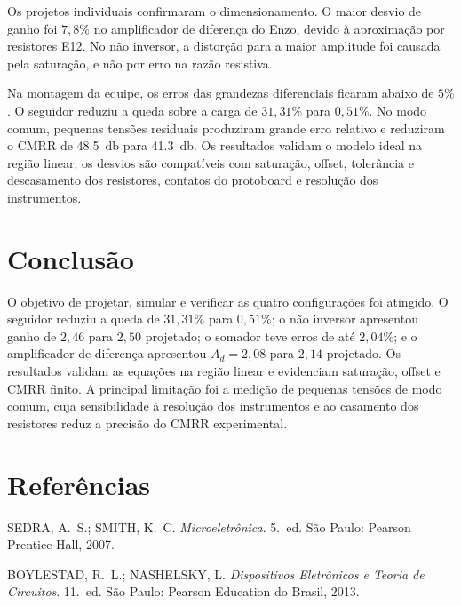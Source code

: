 \documentclass[11pt,a4paper]{article}
\begin{document}
Os projetos individuais confirmaram o dimensionamento. O maior desvio de ganho foi $7,8\%$ no amplificador de diferença do Enzo, devido à aproximação por resistores E12. No não inversor, a distorção para a maior amplitude foi causada pela saturação, e não por erro na razão resistiva.

Na montagem da equipe, os erros das grandezas diferenciais ficaram abaixo de $5\%$. O seguidor reduziu a queda sobre a carga de $31,31\%$ para $0,51\%$. No modo comum, pequenas tensões residuais produziram grande erro relativo e reduziram o CMRR de \SI{48,5}{\decibel} para \SI{41,3}{\decibel}. Os resultados validam o modelo ideal na região linear; os desvios são compatíveis com saturação, offset, tolerância e descasamento dos resistores, contatos do protoboard e resolução dos instrumentos.

\section{Conclusão}

O objetivo de projetar, simular e verificar as quatro configurações foi atingido. O seguidor reduziu a queda de $31,31\%$ para $0,51\%$; o não inversor apresentou ganho de $2,46$ para $2,50$ projetado; o somador teve erros de até $2,04\%$; e o amplificador de diferença apresentou $A_d=2,08$ para $2,14$ projetado. Os resultados validam as equações na região linear e evidenciam saturação, offset e CMRR finito. A principal limitação foi a medição de pequenas tensões de modo comum, cuja sensibilidade à resolução dos instrumentos e ao casamento dos resistores reduz a precisão do CMRR experimental.

\section{Referências}

\begin{referencias}
\item SEDRA, A.~S.; SMITH, K.~C. \emph{Microeletrônica}. 5.~ed. São Paulo: Pearson
      Prentice Hall, 2007.
\item BOYLESTAD, R.~L.; NASHELSKY, L. \emph{Dispositivos Eletrônicos e Teoria de
      Circuitos}. 11.~ed. São Paulo: Pearson Education do Brasil, 2013.
\end{referencias}
\end{document}

